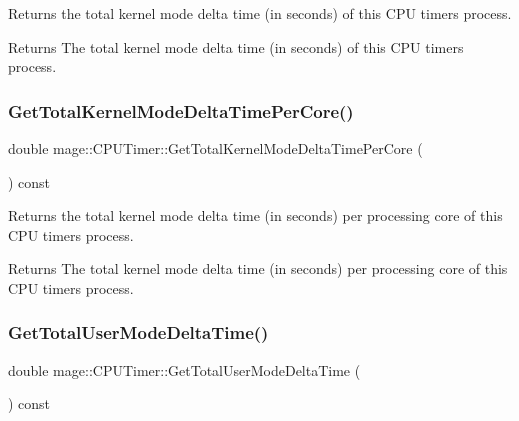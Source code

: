 Returns the total kernel mode delta time (in seconds) of this C\+PU timer\textquotesingle{}s process.

\begin{DoxyReturn}{Returns}
The total kernel mode delta time (in seconds) of this C\+PU timer\textquotesingle{}s process. 
\end{DoxyReturn}
\hypertarget{classmage_1_1_c_p_u_timer_abe27bc40d9e61bdf97755706b4be238c}{}\label{classmage_1_1_c_p_u_timer_abe27bc40d9e61bdf97755706b4be238c} 
\subsubsection{\texorpdfstring{Get\+Total\+Kernel\+Mode\+Delta\+Time\+Per\+Core()}{GetTotalKernelModeDeltaTimePerCore()}}
{\footnotesize\ttfamily double mage\+::\+C\+P\+U\+Timer\+::\+Get\+Total\+Kernel\+Mode\+Delta\+Time\+Per\+Core (\begin{DoxyParamCaption}{ }\end{DoxyParamCaption}) const}

Returns the total kernel mode delta time (in seconds) per processing core of this C\+PU timer\textquotesingle{}s process.

\begin{DoxyReturn}{Returns}
The total kernel mode delta time (in seconds) per processing core of this C\+PU timer\textquotesingle{}s process. 
\end{DoxyReturn}
\hypertarget{classmage_1_1_c_p_u_timer_a098c9ecc1f84918970b4644f0ba8bfc4}{}\label{classmage_1_1_c_p_u_timer_a098c9ecc1f84918970b4644f0ba8bfc4} 
\subsubsection{\texorpdfstring{Get\+Total\+User\+Mode\+Delta\+Time()}{GetTotalUserModeDeltaTime()}}
{\footnotesize\ttfamily double mage\+::\+C\+P\+U\+Timer\+::\+Get\+Total\+User\+Mode\+Delta\+Time (\begin{DoxyParamCaption}{ }\end{DoxyParamCaption}) const}

